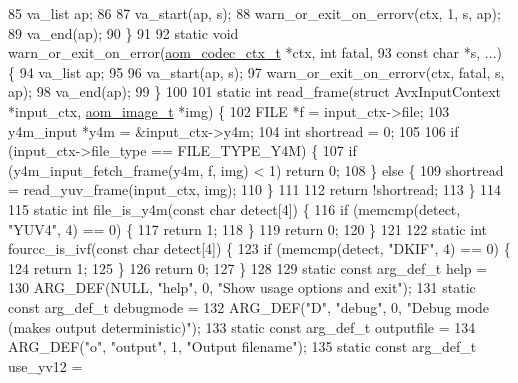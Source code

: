 \begin{DoxyCodeInclude}
{{85   va\_list ap;
86 
87   va\_start(ap, s);
88   warn\_or\_exit\_on\_errorv(ctx, 1, s, ap);
89   va\_end(ap);
90 \}
91 
92 \textcolor{keyword}{static} \textcolor{keywordtype}{void} warn\_or\_exit\_on\_error(\hyperlink{structaom__codec__ctx}{aom\_codec\_ctx\_t} *ctx, \textcolor{keywordtype}{int} fatal,
93     \textcolor{keyword}{const} \textcolor{keywordtype}{char} *s, ...) \{
94   va\_list ap;
95 
96   va\_start(ap, s);
97   warn\_or\_exit\_on\_errorv(ctx, fatal, s, ap);
98   va\_end(ap);
99 \}
100 
101 \textcolor{keyword}{static} \textcolor{keywordtype}{int} read\_frame(\textcolor{keyword}{struct} AvxInputContext *input\_ctx, \hyperlink{structaom__image}{aom\_image\_t} *img) \{
102   FILE *f = input\_ctx->file;
103   y4m\_input *y4m = &input\_ctx->y4m;
104   \textcolor{keywordtype}{int} shortread = 0;
105 
106   \textcolor{keywordflow}{if} (input\_ctx->file\_type == FILE\_TYPE\_Y4M) \{
107     \textcolor{keywordflow}{if} (y4m\_input\_fetch\_frame(y4m, f, img) < 1) \textcolor{keywordflow}{return} 0;
108   \} \textcolor{keywordflow}{else} \{
109     shortread = read\_yuv\_frame(input\_ctx, img);
110   \}
111 
112   \textcolor{keywordflow}{return} !shortread;
113 \}
114 
115 \textcolor{keyword}{static} \textcolor{keywordtype}{int} file\_is\_y4m(\textcolor{keyword}{const} \textcolor{keywordtype}{char} detect[4]) \{
116   \textcolor{keywordflow}{if} (memcmp(detect, \textcolor{stringliteral}{"YUV4"}, 4) == 0) \{
117     \textcolor{keywordflow}{return} 1;
118   \}
119   \textcolor{keywordflow}{return} 0;
120 \}
121 
122 \textcolor{keyword}{static} \textcolor{keywordtype}{int} fourcc\_is\_ivf(\textcolor{keyword}{const} \textcolor{keywordtype}{char} detect[4]) \{
123   \textcolor{keywordflow}{if} (memcmp(detect, \textcolor{stringliteral}{"DKIF"}, 4) == 0) \{
124     \textcolor{keywordflow}{return} 1;
125   \}
126   \textcolor{keywordflow}{return} 0;
127 \}
128 
129 \textcolor{keyword}{static} \textcolor{keyword}{const} arg\_def\_t help =
130     ARG\_DEF(NULL, \textcolor{stringliteral}{"help"}, 0, \textcolor{stringliteral}{"Show usage options and exit"});
131 \textcolor{keyword}{static} \textcolor{keyword}{const} arg\_def\_t debugmode =
132     ARG\_DEF(\textcolor{stringliteral}{"D"}, \textcolor{stringliteral}{"debug"}, 0, \textcolor{stringliteral}{"Debug mode (makes output deterministic)"});
133 \textcolor{keyword}{static} \textcolor{keyword}{const} arg\_def\_t outputfile =
134     ARG\_DEF(\textcolor{stringliteral}{"o"}, \textcolor{stringliteral}{"output"}, 1, \textcolor{stringliteral}{"Output filename"});
135 \textcolor{keyword}{static} \textcolor{keyword}{const} arg\_def\_t use\_yv12 =
}}
\end{DoxyCodeInclude}
